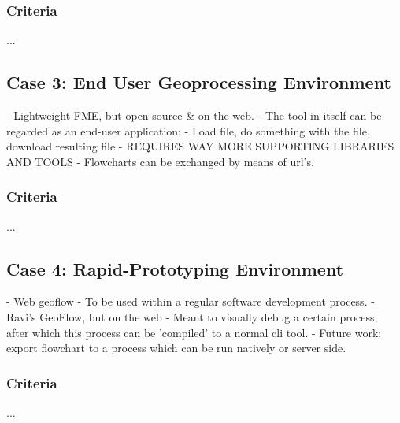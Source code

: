 \subsubsection*{Criteria}
...

\subsection*{Case 3: End User Geoprocessing Environment}
- Lightweight FME, but open source \& on the web.
- The tool in itself can be regarded as an end-user application:
  - Load file, do something with the file, download resulting file
  - REQUIRES WAY MORE SUPPORTING LIBRARIES AND TOOLS
- Flowcharts can be exchanged by means of url's.

\subsubsection*{Criteria}
...

\subsection*{Case 4: Rapid-Prototyping Environment}
- Web geoflow
- To be used within a regular software development process.
- Ravi's GeoFlow, but on the web
- Meant to visually debug a certain process, after which this process can be 'compiled' to a normal cli tool.
- Future work: export flowchart to a process which can be run natively or server side.



\subsubsection*{Criteria}
...






